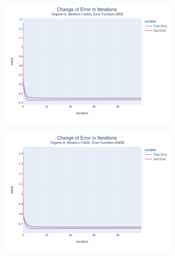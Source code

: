 \documentclass[14pt,a4]{article}
\begin{document}
\begin{figure}[h]
\begin{subfigure}{0.3\textwidth}
        \includegraphics[width=\textwidth]{images/implementation/q1/part_d/error/5_10000_MSE.png}
    \end{subfigure}
    \hfill
    \begin{subfigure}{0.3\linewidth}
        \centering
        \includegraphics[width=\textwidth]{images/implementation/q1/part_d/error/5_10000_RMSE.png}
    \end{subfigure}
    \newline
    \begin{subfigure}{0.3\linewidth}
        \centering

\end{subfigure}
\end{figure}
\end{document}
